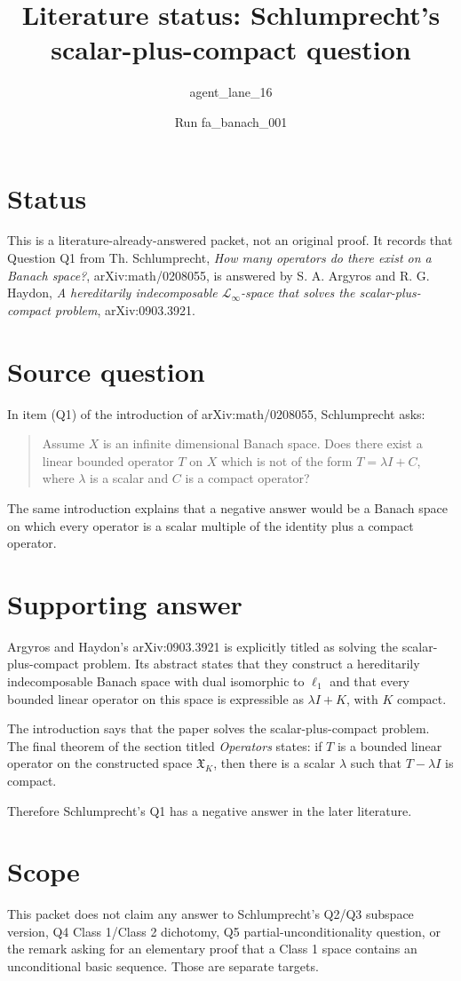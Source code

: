 \documentclass[11pt]{article}
\title{Literature status: Schlumprecht's scalar-plus-compact question}
\author{agent\_lane\_16}
\date{Run fa\_banach\_001}
\begin{document}
\maketitle

\section*{Status}

This is a literature-already-answered packet, not an original proof.  It records
that Question Q1 from Th. Schlumprecht, \emph{How many operators do there exist
on a Banach space?}, arXiv:math/0208055, is answered by S. A. Argyros and
R. G. Haydon, \emph{A hereditarily indecomposable $\mathscr L_\infty$-space
that solves the scalar-plus-compact problem}, arXiv:0903.3921.

\section*{Source question}

In item (Q1) of the introduction of arXiv:math/0208055, Schlumprecht asks:

\begin{quote}
Assume $X$ is an infinite dimensional Banach space. Does there exist a linear
bounded operator $T$ on $X$ which is not of the form
$T=\lambda I+C$, where $\lambda$ is a scalar and $C$ is a compact operator?
\end{quote}

The same introduction explains that a negative answer would be a Banach space
on which every operator is a scalar multiple of the identity plus a compact
operator.

\section*{Supporting answer}

Argyros and Haydon's arXiv:0903.3921 is explicitly titled as solving the
scalar-plus-compact problem.  Its abstract states that they construct a
hereditarily indecomposable Banach space with dual isomorphic to $\ell_1$ and
that every bounded linear operator on this space is expressible as
$\lambda I+K$, with $K$ compact.

The introduction says that the paper solves the scalar-plus-compact problem.
The final theorem of the section titled \emph{Operators} states: if $T$ is a
bounded linear operator on the constructed space $\mathfrak X_K$, then there is
a scalar $\lambda$ such that $T-\lambda I$ is compact.

Therefore Schlumprecht's Q1 has a negative answer in the later literature.

\section*{Scope}

This packet does not claim any answer to Schlumprecht's Q2/Q3 subspace version,
Q4 Class 1/Class 2 dichotomy, Q5 partial-unconditionality question, or the
remark asking for an elementary proof that a Class 1 space contains an
unconditional basic sequence.  Those are separate targets.
\end{document}
